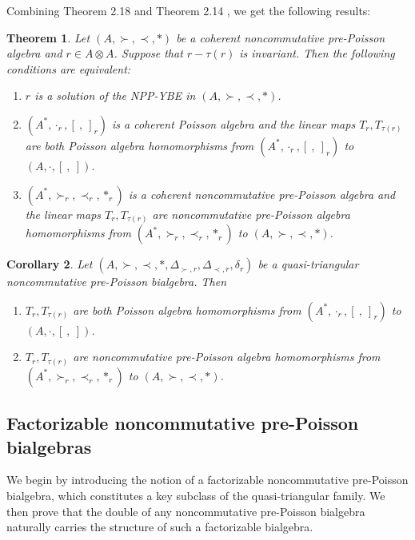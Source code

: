 \documentclass[12pt]{amsart}
\newtheorem{thm}{Theorem}[section]
\newtheorem{cor}[thm]{Corollary}
\theoremstyle{definition}
\begin{document}
Combining Theorem 2.18 \cite {Wa} and Theorem 2.14 \cite {Wbl}, we get the following results:
\begin{thm}\label{QB0} Let $(A,\succ,\prec,\ast)$ be a coherent noncommutative pre-Poisson algebra and
$r\in A\otimes A$. Suppose that $r-\tau(r)$ is invariant. Then the following conditions are equivalent:
 \begin{enumerate}
\item $r$ is a solution of the NPP-YBE in $(A,\succ,\prec,\ast)$.
 \item $(A^{*},\cdot_r, [ \ , \ ]_r)$ is a coherent Poisson algebra and the linear maps
$T_{r},T_{\tau(r)}$ are both Poisson algebra
 homomorphisms from $(A^{*},\cdot_r, [ \ , \ ]_r)$ to $(A,\cdot, [ \ , \ ])$.
 \item $(A^{*},\succ_r,\prec_r,\ast_r)$ is a coherent noncommutative pre-Poisson algebra and the linear maps
$T_{r},T_{\tau(r)}$ are noncommutative pre-Poisson algebra
 homomorphisms from $(A^{*},\succ_r,\prec_r,\ast_r)$ to $(A,\succ,\prec,\ast)$.
 \end{enumerate}
\end{thm}


\begin{cor} \label{QB} Let $(A, \succ,\prec,\ast,\Delta_{\succ,r},\Delta_{\prec,r},\delta_{r})$ be 
a quasi-triangular noncommutative pre-Poisson bialgebra.
 Then  \begin{enumerate}
\item $T_{r},T_{\tau(r)}$ are both Poisson algebra
 homomorphisms from $(A^{*},\cdot_r, [ \ , \ ]_r)$ to $(A,\cdot, [ \ , \ ])$.
 \item $T_{r},T_{\tau(r)}$ are noncommutative pre-Poisson algebra
 homomorphisms from $(A^{*},\succ_r,\prec_r,\ast_r)$ to $(A,\succ,\prec,\ast)$.
 \end{enumerate}
\end{cor}


\subsection{Factorizable noncommutative pre-Poisson bialgebras} 
We begin by introducing the notion of a factorizable noncommutative pre-Poisson bialgebra,
 which constitutes a key subclass of the quasi-triangular family.
  We then prove that the double of any noncommutative pre-Poisson bialgebra 
  naturally carries the structure of such a factorizable bialgebra.
\end{document}
